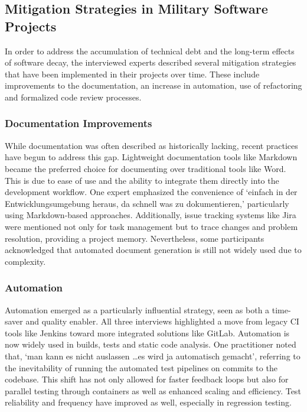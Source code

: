 \subsection{Mitigation Strategies in Military Software Projects}
In order to address the accumulation of technical debt and the long-term effects of software decay, the interviewed experts described several mitigation strategies that have been implemented in their projects over time. These include improvements to the documentation, an increase in automation,
use of refactoring and formalized code review processes.

\subsubsection{Documentation Improvements}
While documentation was often described as historically lacking, recent practices have begun to address this gap. Lightweight documentation tools like Markdown became the preferred choice for documenting over traditional tools like Word. This is due to ease of use and the ability to integrate 
them directly into the development workflow. One expert emphasized the convenience of `einfach in der Entwicklungsumgebung heraus, da schnell was zu dokumentieren,' particularly using Markdown-based approaches. Additionally, issue tracking systems like Jira were mentioned not only for task management
but to trace changes and problem resolution, providing a project memory. Nevertheless, some participants acknowledged that automated document generation is still not widely used due to complexity.\\

\subsubsection{Automation}
Automation emerged as a particularly influential strategy, seen as both a time-saver and quality enabler. All three interviews highlighted a move from legacy CI tools like Jenkins toward more integrated solutions like GitLab. Automation is now widely used in builds, tests and static code analysis.
One practitioner noted that, `man kann es nicht auslassen \ldots es wird ja automatisch gemacht', referring to the inevitability of running the automated test pipelines on commits to the codebase. This shift has not only allowed for faster feedback loops but also for parallel testing through
containers as well as enhanced scaling and efficiency. Test reliability and frequency have improved as well, especially in regression testing.\\

